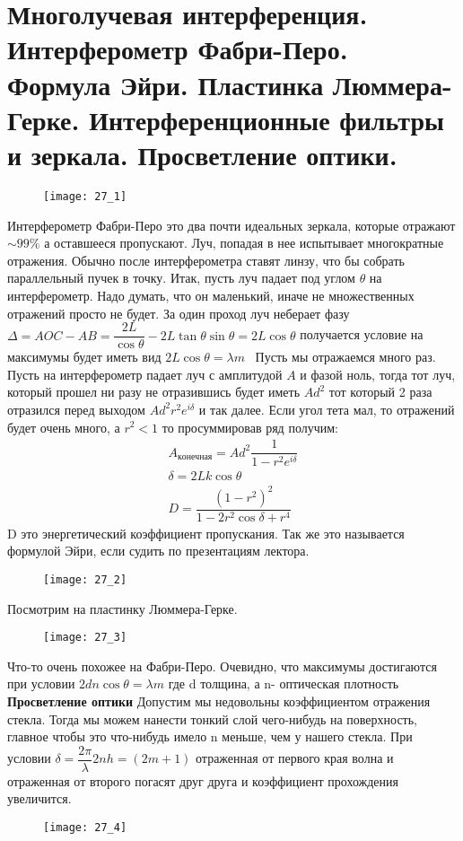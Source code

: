 
	\section{Многолучевая интерференция. Интерферометр Фабри-Перо. Формула Эйри.
		Пластинка Люммера-Герке. Интерференционные фильтры и зеркала. Просветление
		оптики.}
	\begin{figure}[h]
		\centering
		\texttt{[image: 27\_1]}
	\end{figure}
	Интерферометр Фабри-Перо это два почти идеальных зеркала, которые отражают $\sim 99\%$ а оставшееся пропускают. Луч, попадая в нее испытывает многократные отражения. Обычно после интерферометра ставят линзу, что бы собрать параллельный пучек в точку.  Итак, пусть луч падает под углом $\theta$ на интерферометр. Надо думать, что он маленький, иначе не множественных отражений просто не будет. За один проход луч неберает фазу $\Delta = AOC - AB = \dfrac{2L}{\cos \theta} - 2L \tan \theta \sin \theta = 2L \cos \theta$ получается условие на максимумы будет иметь вид $2L \cos \theta = \lambda m$ \
	Пусть мы отражаемся много раз. Пусть на интерферометр падает луч с амплитудой $A$ и фазой ноль, тогда тот луч, который прошел ни разу не отразившись будет иметь $Ad^2$ тот который 2 раза отразился перед выходом $Ad^2 r^2 e^{i\delta}$  и так далее. Если угол тета мал, то отражений будет очень много, а $r^2 <1$ то просуммировав ряд получим:
	 \begin{align*}
	 A_{конечная} = Ad^2 \dfrac{1}{1 - r^2 e^{i\delta}}\\
	 \delta = 2L k\cos \theta\\
	 D = \dfrac{(1 - r^2)^2}{1 - 2r^2 \cos \delta + r^4}
	 \end{align*}
	 D это энергетический коэффициент пропускания. Так же это называется формулой Эйри, если судить по презентациям лектора.\\
	 \begin{figure}[t!]
	 	\centering
	 	\texttt{[image: 27\_2]}
	 \end{figure}
	 	Посмотрим на пластинку Люммера-Герке.
		\begin{figure}[h]
			\texttt{[image: 27\_3]}
		\end{figure}
		Что-то очень похожее на Фабри-Перо. Очевидно, что максимумы достигаются при условии $2d n \cos \theta = \lambda m$ где d толщина, а n- оптическая плотность \newpage
		\textbf{Просветление оптики}
		Допустим мы недовольны коэффициентом отражения стекла. Тогда мы можем нанести тонкий слой чего-нибудь на поверхность, главное чтобы это что-нибудь имело n меньше, чем у нашего стекла. При условии $\delta = \dfrac{2\pi}{\lambda} 2nh = (2m + 1)$ отраженная от первого края волна и отраженная от второго погасят друг друга и коэффициент прохождения увеличится.
		\begin{figure}[H]
			\texttt{[image: 27\_4]}
		\end{figure}